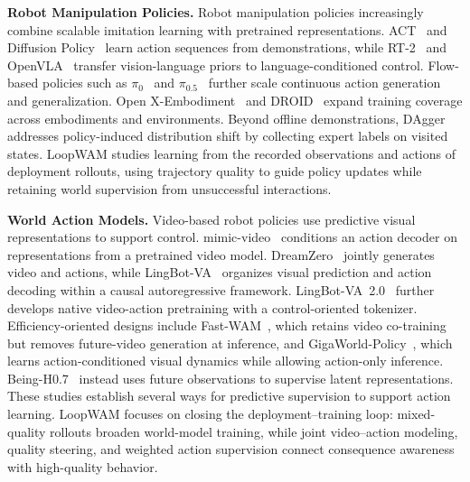
\textbf{Robot Manipulation Policies.}
Robot manipulation policies increasingly combine scalable imitation learning with pretrained representations.
ACT~\citep{zhao2023learning} and Diffusion Policy~\citep{chi2025diffusion} learn action sequences from demonstrations, while RT-2~\citep{zitkovich2023rt2} and OpenVLA~\citep{kim2024openvla} transfer vision-language priors to language-conditioned control.
Flow-based policies such as $\pi_0$~\citep{black2024pi0} and $\pi_{0.5}$~\citep{physicalintelligence2025pi05} further scale continuous action generation and generalization.
Open X-Embodiment~\citep{o2024open} and DROID~\citep{khazatsky2024droid} expand training coverage across embodiments and environments.
Beyond offline demonstrations, DAgger~\citep{ross2011dagger} addresses policy-induced distribution shift by collecting expert labels on visited states.
LoopWAM studies learning from the recorded observations and actions of deployment rollouts, using trajectory quality to guide policy updates while retaining world supervision from unsuccessful interactions.

\textbf{World Action Models.}
Video-based robot policies use predictive visual representations to support control.
mimic-video~\citep{pai2025mimicvideo} conditions an action decoder on representations from a pretrained video model.
DreamZero~\citep{ye2026world} jointly generates video and actions, while LingBot-VA~\citep{lingbot-va2026} organizes visual prediction and action decoding within a causal autoregressive framework.
LingBot-VA~2.0~\citep{zhang2026lingbotva2} further develops native video-action pretraining with a control-oriented tokenizer.
Efficiency-oriented designs include Fast-WAM~\citep{yuan2026fast}, which retains video co-training but removes future-video generation at inference, and GigaWorld-Policy~\citep{ye2026gigaworld}, which learns action-conditioned visual dynamics while allowing action-only inference.
Being-H0.7~\citep{luo2026beingh07} instead uses future observations to supervise latent representations.
These studies establish several ways for predictive supervision to support action learning.
LoopWAM focuses on closing the deployment--training loop: mixed-quality rollouts broaden world-model training, while joint video--action modeling, quality steering, and weighted action supervision connect consequence awareness with high-quality behavior.
